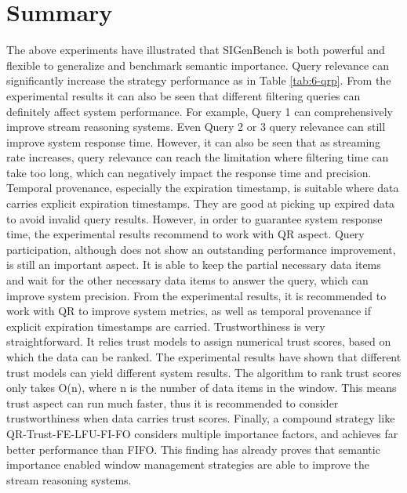 \section{Summary}
The above experiments have illustrated that SIGenBench is both powerful and flexible to generalize and benchmark semantic importance. 
Query relevance can significantly increase the strategy performance as in Table \ref{tab:6-qrp}.
From the experimental results it can also be seen that different filtering queries can definitely affect system performance. 
For example, Query 1 can comprehensively improve stream reasoning systems.
Even Query 2 or 3 query relevance can still improve system response time. 
However, it can also be seen that as streaming rate increases, query relevance can reach the limitation where filtering time can take too long, which can negatively impact the response time and precision. 
Temporal provenance, especially the expiration timestamp, is suitable where data carries explicit expiration timestamps. 
They are good at picking up expired data to avoid invalid query results. 
However, in order to guarantee system response time, the experimental results recommend to work with QR aspect. 
Query participation, although does not show an outstanding performance improvement, is still an important aspect. 
It is able to keep the partial necessary data items and wait for the other necessary data items to answer the query, which can improve system precision. 
From the experimental results, it is recommended to work with QR to improve system metrics, as well as temporal provenance if explicit expiration timestamps are carried. 
Trustworthiness is very straightforward. 
It relies trust models to assign numerical trust scores, based on which the data can be ranked. 
The experimental results have shown that different trust models can yield different system results. 
The algorithm to rank trust scores only takes O(n), where n is the number of data items in the window. 
This means trust aspect can run much faster, thus it is recommended to consider trustworthiness when data carries trust scores. 
Finally, a compound strategy like QR-Trust-FE-LFU-FI-FO considers multiple importance factors, and achieves far better performance than FIFO. 
This finding has already proves that semantic importance enabled window management strategies are able to improve the stream reasoning systems. 